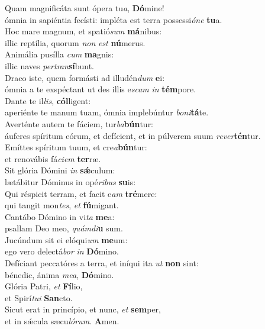 \oddverse Quam magnificáta sunt ópera tu\textit{a}, \textbf{Dó}mine!~\*\\
\oddverse ómnia in sapiéntia fecísti: impléta est terra possessi\textit{ó}\textit{ne} \textbf{tu}a.\\
\evenverse Hoc mare magnum, et spatió\textit{sum} \textbf{má}nibus:~\*\\
\evenverse illic reptília, quorum \textit{non} \textit{est} \textbf{nú}merus.\\
\oddverse Animália pusílla \textit{cum} \textbf{ma}gnis:~\*\\
\oddverse illic naves \textit{per}\textit{tran}\textbf{sí}bunt.\\
\evenverse Draco iste, quem formásti ad illudén\textit{dum} \textbf{e}i:~\*\\
\evenverse ómnia a te exspéctant ut des illis e\textit{scam} \textit{in} \textbf{tém}pore.\\
\oddverse Dante te il\textit{lis}, \textbf{cól}ligent:~\*\\
\oddverse aperiénte te manum tuam, ómnia implebúntur \textit{bo}\textit{ni}\textbf{tá}te.\\
\evenverse Averténte autem te fáciem, tur\textit{ba}\textbf{bún}tur:~\*\\
\evenverse áuferes spíritum eórum, et defícient, et in púlverem suum \textit{re}\textit{ver}\textbf{tén}tur.\\
\oddverse Emíttes spíritum tuum, et cre\textit{a}\textbf{bún}tur:~\*\\
\oddverse et renovábis fá\textit{ci}\textit{em} \textbf{ter}ræ.\\
\evenverse Sit glória Dómini \textit{in} \textbf{sǽ}culum:~\*\\
\evenverse lætábitur Dóminus in opé\textit{ri}\textit{bus} \textbf{su}is:\\
\oddverse Qui réspicit terram, et facit e\textit{am} \textbf{tré}mere:~\*\\
\oddverse qui tangit mon\textit{tes}, \textit{et} \textbf{fú}migant.\\
\evenverse Cantábo Dómino in vi\textit{ta} \textbf{me}a:~\*\\
\evenverse psallam Deo meo, \textit{quám}\textit{di}\textbf{u} sum.\\
\oddverse Jucúndum sit ei elóqui\textit{um} \textbf{me}um:~\*\\
\oddverse ego vero delectá\textit{bor} \textit{in} \textbf{Dó}mino.\\
\evenverse Defíciant peccatóres a terra, et iníqui ita \textit{ut} \textbf{non} sint:~\*\\
\evenverse bénedic, ánima \textit{me}\textit{a}, \textbf{Dó}mino.\\
\oddverse Glória Patri, \textit{et} \textbf{Fí}lio,~\*\\
\oddverse et Spirí\textit{tu}\textit{i} \textbf{San}cto.\\
\evenverse Sicut erat in princípio, et nunc, \textit{et} \textbf{sem}per,~\*\\
\evenverse et in sǽcula sæcu\textit{ló}\textit{rum}. \textbf{A}men.\\
